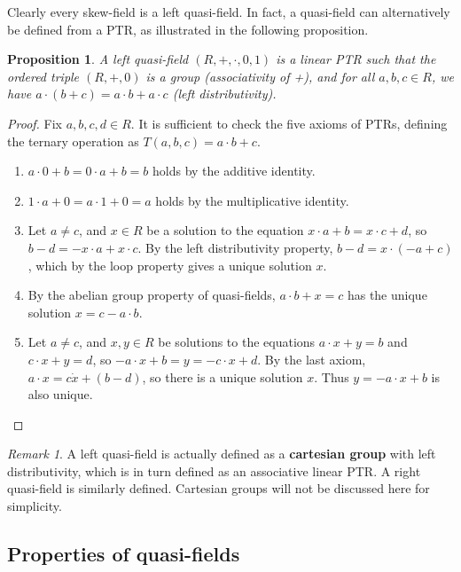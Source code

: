 \documentclass{report}
\newtheorem{proposition}[theorem]{Proposition}
\theoremstyle{definition}\newtheorem*{definition}{Definition}
\theoremstyle{definition}\newtheorem*{example}{Example}
\theoremstyle{remark}\newtheorem*{remark}{Remark}
\begin{document}
Clearly every skew-field is a left quasi-field. In fact, a quasi-field can alternatively be defined from a PTR, as illustrated in the following proposition.

\begin{proposition}
A left quasi-field $ (R, +, \cdot, 0, 1) $ is a linear PTR such that the ordered triple $ (R, +, 0) $ is a group (associativity of +), and for all $ a, b, c \in R $, we have $ a \cdot (b + c) = a \cdot b + a \cdot c $ (left distributivity).
\end{proposition}

\begin{proof}
Fix $ a, b, c, d \in R $. It is sufficient to check the five axioms of PTRs, defining the ternary operation as $ T(a, b, c) = a \cdot b + c $.
\begin{enumerate}
  \item $ a \cdot 0 + b = 0 \cdot a + b = b $ holds by the additive identity.
  \item $ 1 \cdot a + 0 = a \cdot 1 + 0 = a $ holds by the multiplicative identity.
  \item Let $ a \ne c $, and $ x \in R $ be a solution to the equation $ x \cdot a + b = x \cdot c + d $, so $ b - d = - x \cdot a + x \cdot c $. By the left distributivity property, $ b - d = x \cdot (-a + c) $, which by the loop property gives a unique solution $ x $.
  \item By the abelian group property of quasi-fields, $ a \cdot b + x = c $ has the unique solution $ x = c - a \cdot b $.
  \item Let $ a \ne c $, and $ x, y \in R $ be solutions to the equations $ a \cdot x + y = b $ and $ c \cdot x + y = d $, so $ -a \cdot x + b = y = -c \cdot x + d $. By the last axiom, $ a \cdot x = c \dot x + (b - d) $, so there is a unique solution $ x $. Thus $ y = -a \cdot x + b $ is also unique.
\end{enumerate}
\end{proof}

\begin{remark}
A left quasi-field is actually defined as a \textbf{cartesian group} with left distributivity, which is in turn defined as an associative linear PTR. A right quasi-field is similarly defined. Cartesian groups will not be discussed here for simplicity.
\end{remark}

\subsection{Properties of quasi-fields}
\end{document}
